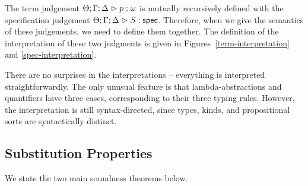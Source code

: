 The term judgement ${\Theta; \Gamma; \Delta} \vartriangleright {p} : {\omega}$ is mutually recursively
defined with the specification judgement ${\Theta; \Gamma; \Delta} \vartriangleright {S} : \mathsf{spec}$. Therefore, when
we give the semantics of these judgements, we need to define them
together. The definition of the interpretation of these two judgments
is given in Figures~\ref{term-interpretation} and
\ref{spec-interpretation}.

There are no surprises in the interpretations -- everything is
interpreted straightforwardly. The only unusual feature is that
lambda-abstractions and quantifiers have three cases, corresponding to
their three typing rules. However, the interpretation is still
syntax-directed, since types, kinds, and propositional sorts are
syntactically distinct.

\subsection{Substitution Properties}

We state the two main soundness theorems below. 

